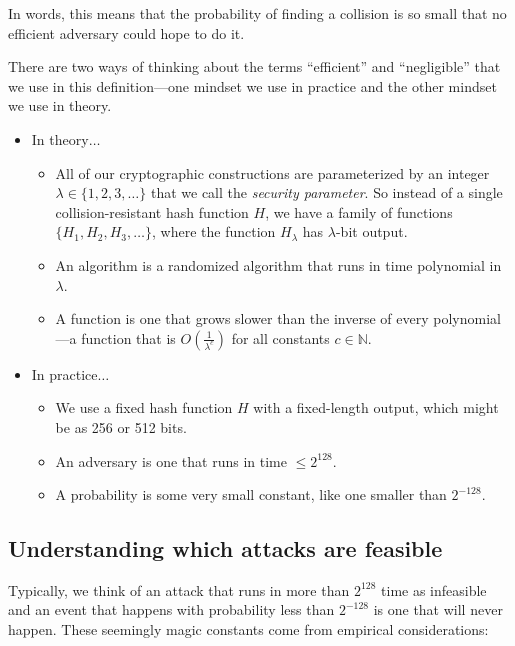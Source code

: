 In words, this means that the probability of finding a collision is so small that no efficient adversary could hope to do it.

There are two ways of thinking about the terms ``efficient'' and ``negligible'' that 
we use in this definition---one mindset we use in practice and the other mindset we use in theory.

\begin{itemize}
	\item In theory$\ldots$
		\begin{itemize}
      \item All of our cryptographic constructions are parameterized by an integer $\lambda \in \{1, 2, 3, \dots\}$
            that we call the \textit{security parameter}.
            So instead of a single collision-resistant hash function $H$, we have a family of functions
            $\{ H_1, H_2, H_3, \dots \}$, where the function $H_\lambda$ has $\lambda$-bit output. 
			\item An  algorithm is a randomized algorithm that runs in time polynomial in $\lambda$.
			\item A  function is one that grows slower than the inverse of every polynomial---a function that is $O(\frac{1}{\lambda^c})$
            for all constants $c \in \mathbb{N}$.  
		\end{itemize}
	\item In practice$\ldots$
		\begin{itemize}
			\item We use a fixed hash function $H$ with a fixed-length output,
        which might be as 256 or 512 bits.
			\item An  adversary is one that runs in time $\leq 2^{128}$.
			\item A  probability is some very small constant, like one smaller than $2^{-128}$.
		\end{itemize}
\end{itemize}

\subsection{Understanding which attacks are feasible}

Typically, we think of an attack that runs in more than $2^{128}$ time
as infeasible and an event that happens with probability less than $2^{-128}$
is one that will never happen.
These seemingly magic constants come from empirical considerations:

